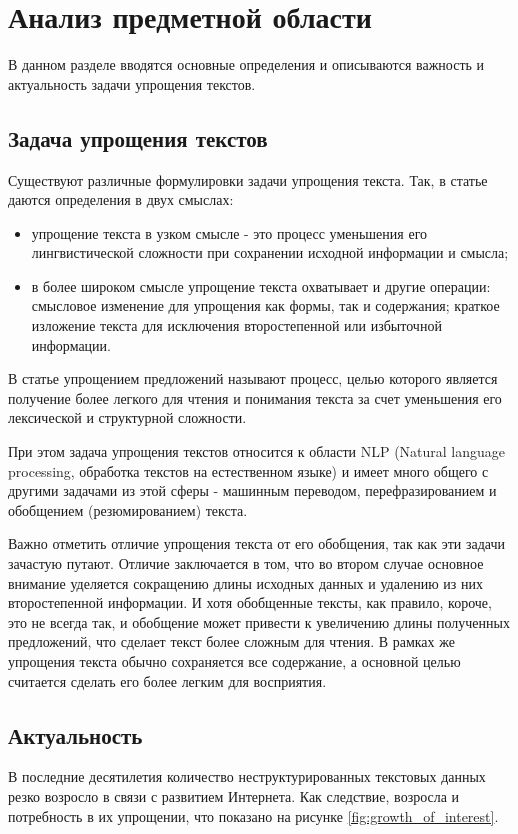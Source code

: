 \chapter{Анализ предметной области}

В данном разделе вводятся основные определения и описываются важность и актуальность задачи упрощения текстов.

\section{Задача упрощения текстов}


Существуют различные формулировки задачи упрощения текста. 
Так, в статье \cite{siddharthan_survey_2014} даются определения в двух смыслах:
\begin{itemize}
	\item упрощение текста в узком смысле - это процесс уменьшения его лингвистической сложности при сохранении исходной информации и смысла;
	\item в более широком смысле упрощение текста охватывает и другие операции: смысловое изменение для упрощения как формы, так и содержания; краткое изложение текста для исключения второстепенной или избыточной информации.
\end{itemize}

В статье \cite{martin_muss_2021} упрощением предложений называют процесс, целью которого является получение более легкого для чтения и понимания текста за счет уменьшения его лексической и структурной сложности.

При этом задача упрощения текстов относится к области NLP (Natural language processing, обработка текстов на естественном языке) и имеет много общего с другими задачами из этой сферы - машинным переводом, перефразированием и обобщением (резюмированием) текста\cite{zhu_monolingual_2010}. 

Важно отметить отличие упрощения текста от его обобщения, так как эти задачи зачастую путают. Отличие заключается в том, что во втором случае основное внимание уделяется сокращению длины исходных данных и удалению из них второстепенной информации. И хотя обобщенные тексты, как правило, короче, это не всегда так, и обобщение может привести к увеличению длины полученных предложений\cite{shardlow_survey_2014}, что сделает текст более сложным для чтения. В рамках же упрощения текста обычно сохраняется все содержание, а основной целью считается сделать его более легким для восприятия.

\section{Актуальность}
В последние десятилетия количество неструктурированных текстовых данных резко возросло в связи с развитием Интернета. Как следствие, возросла и потребность в их упрощении, что показано на рисунке \ref{fig:growth_of_interest}. 


